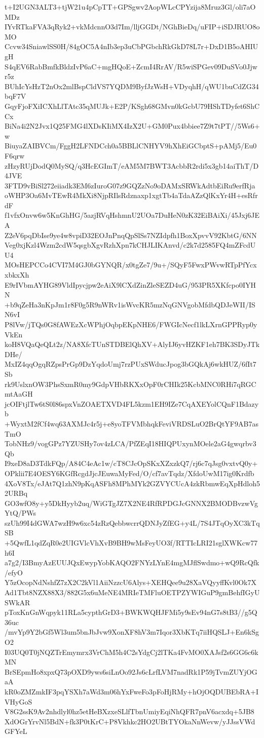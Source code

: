 t+I2UGN3ALT3+tjW21u4pCpTT+GPSgwv2AopWLcCPYzija8Mruz3Gl/oli7aOMDz
IYvRTkaFVA3qRyk2+vkMdcnnO3d7Im/lljGGDt/NGhBieDq/uFIP+iSDJRUO8oMO
Ccvw34SniawlSS0H/84gOC5A4nIb3ep3uCbPGbchRkGkD78L7r+DxD1B5oAHIUgH
S4qEV6RabBmfkBldzIvP6aC+mgHQoE+ZcmI4RrAV/R5wiSPGev09DuSVo0Jjwr5z
BUhIcYsHzT2nOx2mlBspCldVS7YQDM9ByfJzWsH+VDyqhH/qWU1buCdZG34bqF7V
GqyFjoFXiICXhLlTAtc35qMUJk+E2P/KSgh68GMvn0kGcbU79HShTDyfet6ShCCx
BiNa4i2N2Jvx1Q25FMG4lXDsKIiMX4IzX2U+GM0Pux4bbiee7Z9t7tPT//5Ws6+w
BiuyaZAIBVCm/FggH2LFNDCch0a5BBLlCNHYV9hXhEiGCbptS+pAMj5/Eu0F6qrw
zHzyRUjDodQ0MySQ/q3HcEGImT/eAM5M7BWT3AcbbR2rdi5x3gb14aiThT/D4JVE
3FTD9vBiSl272eiiadk3EM6zIuroG07z9GQZzNo9oDAMxSRWkAdtbEiRu9erfRja
oWHP3Oa6MvTEwR4MkXi8NjpRIlsRdznaxp1xgtTb4aTdaAZzQlKxYr4H+esRfrdF
f1vfxOnvw6w5KnGhHG/5azjRVqHshmnU2UOa7DuHeN0zK32EiBAiXi/45Jxj6JEA
Z2eV6pqDbIse9ye4w8vpiD32EOJnPnqQpSlSs7NZIdpfh1BoxXpvvV92KbtG/6NN
Veg0xjKzl4Wzm2cdW5qsgbXgvRzhXpn7kCHJLIKAnvd/c2k7d2585FQ4mZFcdUU4
MOsHEPCCo4CVI7M4GJ0bGYNQR/x0tgZe7/9u+/SQyF5FwxPWvwRTpPfYcxxbkxXh
E9rIVbmAYHG89VldIpycjpw2eAiX9lCXdZinZleSEZD4uG/953PR5XKfcpo0IYHN
+b9qZeHa3nKpJm1r8F0g5R9nWRv1isWvcKR5mzNqGNVgobMfdbQDJeWII/ISN6vI
P8lVw/jTQs0G8fAWEzXcWPhjOqbpEKpNHE6/FWGIcNecf1lkLXrnGPPRyp0yVkEn
koH8VQaQeQLt2z/NA8XfcTUnSTDBElQhXV+AlyIJ6yvHZKF1eh7BK3SDyJTkDHe/
MxIZ4qqOgqRZpsPrGp9DzYqdoUmj7rzPUxSWducJpog3bGQkAj6wkHUZ/6fIt7Sb
rk9UslxnOW3PhsSxmR0my9GdpVHbRKXxOpF0rCHIk25KcbMNC0RHi7qRGCmtAaGH
jcOIFtjlTw6tS0l86spxVnZOAETXVD4FL5kzm1EH9IZe7CqAXEYolCQnF1Bdazyb
+WyxtM2fCf4wq63AXMJc4r5j+e8yoTFVMbhqkFeviVRDSLuO2BrQtYF9AB7asTmO
TobNHz9/vogGPz7YZUSHy7ov4zLCA/PfZEqI18HIQPUxynMOele2aG4gwqrbv3Qb
I9xeD8aD3TdkFQp/A84C4eAc1w/cT8CJcOpSKxXZxzkQ7/rj6c7qJsg0vxtvQ0y+
OPklii7E4OESY6KGfRcgdJjcJEuwaMyFed/O/cf7avTqdz/XfdoUwM17ig0Krdfb
4XoV8Tx/eJAt7Q1zhN9pKqASFh8MPhMYk2GZVYCUcA4zkRbmwEqXpHdloh52URBq
GO3wfO8y+y5DkHyyb2uq/WiGTgJZ7X2NE4RfRPDGJcGNNX2BMODBvzwVgYtQ/PWs
szUh99I4dGWA7wzH9w6xc54zRzQebbwcrrQDNJyZfEG+y4L/7S4JTqOyXC3kTqSB
+5QwfL1qdZqR0e2UIGVlcVhXvB9BH9wMsFeyUO3f/RTTIcLRI21sglXWKcw77h6I
a7g2/I3BmyAzEUUJQxEwypYobKAQO2FNYzLYnE4mgMJflSwdmo+wQ9RcQfk/efyO
Y5zOcopNdNshfZ7zX2C2kVl1AiiNzzcU6Alys+XEHQee9u28XaVQyyffKvl0Ok7X
Ad1Tbt8NZX88X3/882G5x6uMeNE4MRIeTMFluOETPZYWIGuP9gmBehfIGyUSWkAR
pToxKnGnWqpyk11RLa5cypthGrD3+BWKWQHJFMi5y9sEv94nG7s8tB3//g5Q36uc
/mvYp9Y2bGf5Wl3um5bnJbJvw9XonXF8hV3m7Iqor3XbKTq7iiHQSLJ+En6kSgO2
I03UQ0T0jNQZTrEmymrx3VrChM5h4C2sYdgCj2lTKa4FvMO0XAJsf2s6GG6c6kMN
BrSEpmHo8xpxQ73pOXD9yws6siLnOo92Js6cLrfLVM7nadRk1P59jTvmZUYjOGaA
kR0oZMZmkIF3pqYSXh7aWd3m06hYxFweFo3pFoHjRMy+hOjOQDUBEbRA+IVHyGoS
V8G2ssK9Av2nhdlyl0hz5etHeBXzxeSLlfTbnUmiyEqiNhQFR7pnV6acxdq+5JB8
XdOGrYrvNl5BdN+fk3P0tKrC+P8Vkhkc2HO2UBtTYOkaNnWevw/yJJssVWdGFYeL
